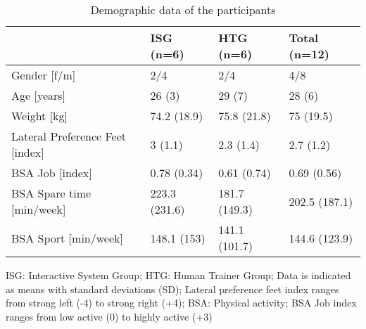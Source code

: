\begin{table}[]
\centering
  \begin{threeparttable}
\caption{Demographic data of the participants}
\label{tab:6_2_demographic}
\begin{tabular}{@{}llll@{}}
\toprule
                                & ISG (n=6)     & HTG (n=6)     & Total (n=12)  \\ \midrule
Gender [f/m]                    & 2/4           & 2/4           & 4/8           \\
Age [years]                     & 26 (3)        & 29 (7)        & 28 (6)        \\
Weight [kg]                     & 74.2 (18.9)   & 75.8 (21.8)   & 75 (19.5)     \\
Lateral Preference Feet [index] & 3 (1.1)       & 2.3 (1.4)     & 2.7 (1.2)     \\
BSA Job [index]                 & 0.78 (0.34)   & 0.61 (0.74)   & 0.69 (0.56)   \\
BSA Spare time [min/week]       & 223.3 (231.6) & 181.7 (149.3) & 202.5 (187.1) \\
BSA Sport [min/week]            & 148.1 (153)   & 141.1 (101.7) & 144.6 (123.9) \\ \bottomrule
\end{tabular}
    \begin{tablenotes}
      \small
      \item ISG: Interactive System Group; HTG: Human Trainer Group; Data is indicated as means with standard deviations (SD); Lateral preference feet index ranges from strong left (-4) to strong right (+4); BSA: Physical activity; BSA Job index ranges from low active (0) to highly active (+3)
    \end{tablenotes}
  \end{threeparttable}
\end{table}
